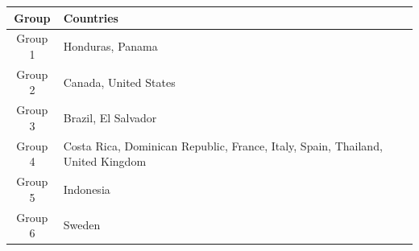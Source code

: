 \begin{tabular}{|c|p{12cm}|}
\toprule
Group & Countries \\
\midrule
Group 1 & Honduras, Panama \\
Group 2 & Canada, United States \\
Group 3 & Brazil, El Salvador \\
Group 4 & Costa Rica, Dominican Republic, France, Italy, Spain, Thailand, United Kingdom \\
Group 5 & Indonesia \\
Group 6 & Sweden \\
\bottomrule
\end{tabular}
